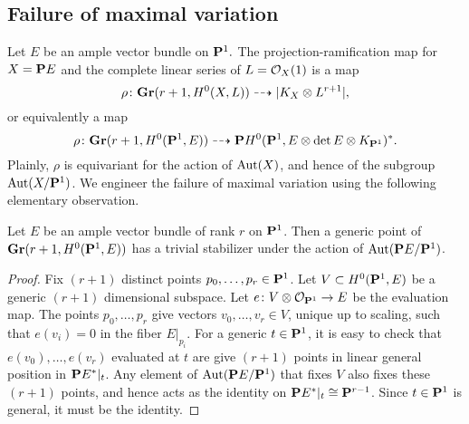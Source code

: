 \subsection{Failure of maximal variation}\label{sec:failure}
Let $E$ be an ample vector bundle on $\P^1.$
The projection-ramification map for $X = \P E$ and the complete linear series of $L = \O_X(1)$ is a map
\[ \rho \from \Gr(r+1, H^0(X, L)) \dashrightarrow |K_X \otimes L^{r+1}|,\]
or equivalently a map
\[ \rho \from \Gr(r+1, H^0(\P^1, E)) \dashrightarrow \P H^0(\P^1, E \otimes \det E \otimes K_{\P^1})^*.\]
Plainly, $\rho$ is equivariant for the action of $\Aut(X)$, and hence of the subgroup $\Aut(X/\P^1)$.
We engineer the failure of maximal variation using the following elementary observation.
\begin{proposition}\label{prop:trivialStabilizer}
  Let $E$ be an ample vector bundle of rank $r$ on $\P^1$.
  Then a generic point of $\Gr(r+1, H^0(\P^1, E))$ has a trivial stabilizer under the action of $\Aut(\P E/\P^1)$.
\end{proposition}
 \begin{proof}
   Fix $(r+1)$ distinct points $p_0, \dots, p_r \in \P^1$.
   Let $V \subset H^0(\P^1, E)$ be a generic $(r+1)$ dimensional subspace.
   Let $e \from V \otimes \O_{\P^1} \to E$ be the evaluation map.
   The points $p_0, \dots, p_r$ give vectors $v_0, \dots, v_r \in V$, unique up to scaling, such that $e(v_i) = 0$ in the fiber $E|_{p_i}$.
   For a generic $t \in \P^1$, it is easy to check that $e(v_0), \dots, e(v_r)$ evaluated at $t$ are give $(r+1)$ points in linear general position in $\P E^*|_{t}$.
   Any element of $\Aut(\P E/\P^1)$ that fixes $V$ also fixes these $(r+1)$ points, and hence acts as the identity on $\P E^*|_t \cong \P^{r-1}$.
   Since $t \in \P^1$ is general, it must be the identity.
 \end{proof}


